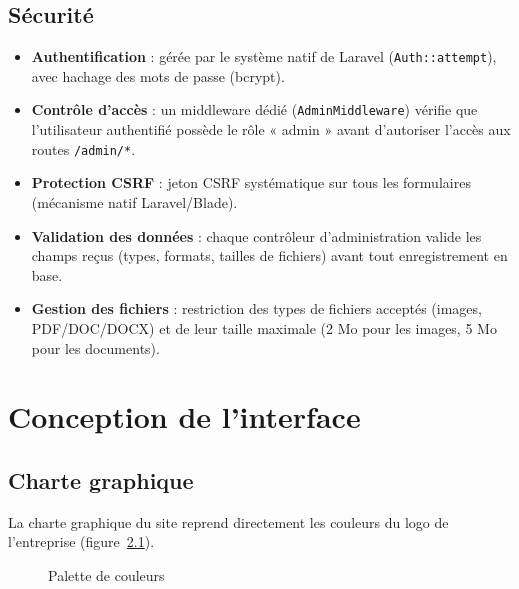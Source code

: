 \documentclass[11pt,a4paper]{report}
\begin{document}
\section{Sécurité}

\begin{itemize}[leftmargin=1.2em]
    \item \textbf{Authentification} : gérée par le système natif de Laravel
    (\texttt{Auth::attempt}), avec hachage des mots de passe (bcrypt).
    \item \textbf{Contrôle d'accès} : un middleware dédié
    (\texttt{AdminMiddleware}) vérifie que l'utilisateur authentifié possède
    le rôle « admin » avant d'autoriser l'accès aux routes
    \texttt{/admin/*}.
    \item \textbf{Protection CSRF} : jeton CSRF systématique sur tous les
    formulaires (mécanisme natif Laravel/Blade).
    \item \textbf{Validation des données} : chaque contrôleur
    d'administration valide les champs reçus (types, formats, tailles de
    fichiers) avant tout enregistrement en base.
    \item \textbf{Gestion des fichiers} : restriction des types de fichiers
    acceptés (images, PDF/DOC/DOCX) et de leur taille maximale (2 Mo pour les
    images, 5 Mo pour les documents).
\end{itemize}

\chapter{Conception de l'interface}

\section{Charte graphique}

La charte graphique du site reprend directement les couleurs du logo de
l'entreprise (figure~\ref{fig:palette}).

\begin{figure}[h!]
\centering
{}
\caption{Palette de couleurs}
\label{fig:palette}
\end{figure}
\end{document}

